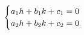 \documentclass[preview]{standalone}
\begin{document}
\begin{align*}
\special{dvisvgm:raw <g id='unique000'>}\begin{cases} a_1 h + b_1 k + c_1 = 0 \\ a_2 h + b_2 k + c_2 = 0 \end{cases}\special{dvisvgm:raw </g>}
\end{align*}
\end{document}

